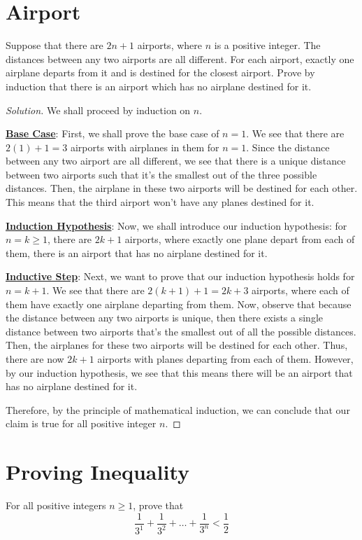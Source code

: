 \documentclass{article}
\newenvironment{solution}{\begin{proof}[Solution]}{\end{proof}}
\begin{document}
\section{Airport}
\begin{hw}
	Suppose that there are $2n+1$ airports, where $n$ is a positive integer. The distances between any two airports are all different. For each airport, exactly one airplane departs from it and is destined for the closest airport. Prove by induction that there is an airport which has no airplane destined for it.
\end{hw}
\begin{solution}
	We shall proceed by induction on $n$.
	
	\underline{\textbf{Base Case}}: First, we shall prove the base case of $n=1$. We see that there are $2(1)+1 = 3$ airports with airplanes in them for $n=1$. Since the distance between any two airport are all different, we see that there is a unique distance between two airports such that it's the smallest out of the three possible distances. Then, the airplane in these two airports will be destined for each other. This means that the third airport won't have any planes destined for it.
	
	\underline{\textbf{Induction Hypothesis}}: Now, we shall introduce our induction hypothesis: for $n=k \geq 1$, there are $2k+1$ airports, where exactly one plane depart from each of them, there is an airport that has no airplane destined for it.
	
	\underline{\textbf{Inductive Step}}: Next, we want to prove that our induction hypothesis holds for $n=k+1$. We see that there are $2(k+1)+1 = 2k+3$ airports, where each of them have exactly one airplane departing from them. Now, observe that because the distance between any two airports is unique, then there exists a single distance between two airports that's the smallest out of all the possible distances. Then, the airplanes for these two airports will be destined for each other. Thus, there are now $2k+1$ airports with planes departing from each of them. However, by our induction hypothesis, we see that this means there will be an airport that has no airplane destined for it.
	
	Therefore, by the principle of mathematical induction, we can conclude that our claim is true for all positive integer $n$.
\end{solution}

\newpage

\section{Proving Inequality}
\begin{hw}
	For all positive integers $n \geq 1$, prove that
	\begin{equation*}
		\dfrac{1}{3^{1}} + \dfrac{1}{3^{2}} + \ldots + \dfrac{1}{3^{n}} < \dfrac{1}{2}
	\end{equation*}
\end{hw}
\end{document}
